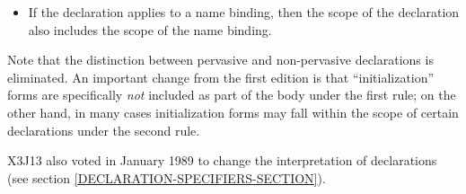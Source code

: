 \begin{defspec}
\begin{new}
\begin{itemize}
\item If the declaration applies to a name binding, then the scope of the
declaration also includes the scope of the name binding.
\end{itemize}
Note that
the distinction between pervasive and non-pervasive
declarations is eliminated.  An important change
from the first edition is that ``initialization''
forms are specifically {\it not} included as part of the body under the first
rule; on the other hand, in many cases initialization forms may fall
within the scope of certain declarations under the second rule.
\end{new}

\begin{new}
X3J13 also voted in January 1989
to change the interpretation
of  declarations (see section \ref{DECLARATION-SPECIFIERS-SECTION}).
\end{new}


\end{defspec}
